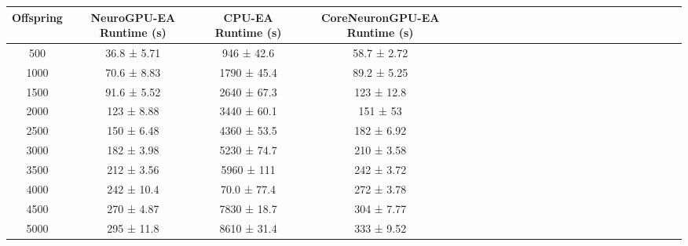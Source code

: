 \begin{tabular}{|c|c|c|c|c|c|c|c|c|c|c|c|c|c|c|c|c|c|c|c|c|c|c|c|}
\toprule
 Offspring & NeuroGPU-EA Runtime (s) & CPU-EA Runtime (s) & CoreNeuronGPU-EA Runtime (s) \\
\midrule
       500 &             36.8 ± 5.71 &         946 ± 42.6 &                  58.7 ± 2.72 \\
      1000 &             70.6 ± 8.83 &        1790 ± 45.4 &                  89.2 ± 5.25 \\
      1500 &             91.6 ± 5.52 &        2640 ± 67.3 &                   123 ± 12.8 \\
      2000 &              123 ± 8.88 &        3440 ± 60.1 &                     151 ± 53 \\
      2500 &              150 ± 6.48 &        4360 ± 53.5 &                   182 ± 6.92 \\
      3000 &              182 ± 3.98 &        5230 ± 74.7 &                   210 ± 3.58 \\
      3500 &              212 ± 3.56 &         5960 ± 111 &                   242 ± 3.72 \\
      4000 &              242 ± 10.4 &        70.0 ± 77.4 &                   272 ± 3.78 \\
      4500 &              270 ± 4.87 &        7830 ± 18.7 &                   304 ± 7.77 \\
      5000 &              295 ± 11.8 &        8610 ± 31.4 &                   333 ± 9.52 \\
\bottomrule
\end{tabular}
